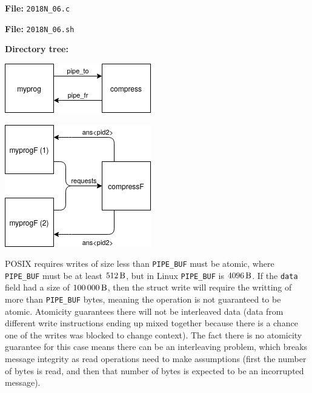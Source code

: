 \documentclass{sope}
\begin{document}
{\textbf{File:} \texttt{2018N\_06.c}

\textbf{File:} \texttt{2018N\_06.sh}

\textbf{Directory tree:}


\begin{center}
    \includegraphics[scale=0.5]{2018N_07_a}
\end{center}


\begin{center}
    \includegraphics[scale=0.5]{2018N_07_b}
\end{center}


POSIX requires writes of size less than \texttt{PIPE\_BUF} must be atomic, where \texttt{PIPE\_BUF} must be at least $\SI{512}{\byte}$, but in Linux \texttt{PIPE\_BUF} is $\SI{4096}{\byte}$. If the \texttt{data} field had a size of $\SI{100000}{\byte}$, then the struct write will require the writting of more than \texttt{PIPE\_BUF} bytes, meaning the operation is not guaranteed to be atomic. Atomicity guarantees there will not be interleaved data (data from different write instructions ending up mixed together because there is a chance one of the writes was blocked to change context). The fact there is no atomicity guarantee for this case means there can be an interleaving problem, which breaks message integrity as read operations need to make assumptions (first the number of bytes is read, and then that number of bytes is expected to be an incorrupted message).

}
\end{document}
